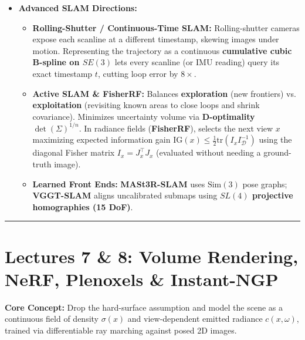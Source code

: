 \documentclass[10pt, a4paper]{article}
\newcommand{\hr}{\vspace{0.8em}\hrule\vspace{0.8em}}
\begin{document}
\begin{itemize}
\begin{itemize}
        \item \textbf{Thread 2 --- Local Mapping (per keyframe):} Updates the \textbf{Covisibility Graph} (edges between keyframes sharing $\ge 15$ points), triangulates new points, runs \textbf{Local BA} on the covisible neighborhood (keeping outer keyframes fixed), and culls redundant keyframes (where $\ge 90\%$ of points are seen by $\ge 3$ other keyframes).
        \item \textbf{Thread 3 --- Loop Closing \& Relocalization:} Queries a hierarchical \textbf{Bag of Binary Words (DBoW2)} vocabulary tree ($k$ branches, $L$ levels $\Rightarrow k^L$ words in only $kL$ comparisons) with an \textbf{inverted index}. Because monocular SLAM has \textbf{7-DoF drift} (rotation, translation, \emph{and scale}), loop correction optimizes the Essential Graph over \textbf{$\text{Sim}(3)$ similarity transforms} ($e_{ij} = \log(Z_{ij}^{-1} S_i S_j^{-1})^\vee \in \mathbb{R}^7$) rather than $SE(3)$.
    \end{itemize}
    \item \textbf{Advanced SLAM Directions:}
    \begin{itemize}
        \item \textbf{Rolling-Shutter / Continuous-Time SLAM:} Rolling-shutter cameras expose each scanline at a different timestamp, skewing images under motion. Representing the trajectory as a continuous \textbf{cumulative cubic B-spline on $SE(3)$} lets every scanline (or IMU reading) query its exact timestamp $t$, cutting loop error by $8\times$.
        \item \textbf{Active SLAM \& FisherRF:} Balances \textbf{exploration} (new frontiers) vs. \textbf{exploitation} (revisiting known areas to close loops and shrink covariance). Minimizes uncertainty volume via \textbf{D-optimality} $\det(\Sigma)^{1/n}$. In radiance fields (\textbf{FisherRF}), selects the next view $x$ maximizing expected information gain $\text{IG}(x) \le \frac{1}{2}\text{tr}(I_x I_{\mathcal{D}}^{-1})$ using the diagonal Fisher matrix $I_x = J_x^\top J_x$ (evaluated without needing a ground-truth image).
        \item \textbf{Learned Front Ends:} \textbf{MASt3R-SLAM} uses $\text{Sim}(3)$ pose graphs; \textbf{VGGT-SLAM} aligns uncalibrated submaps using \textbf{$SL(4)$ projective homographies (15 DoF)}.
    \end{itemize}
\end{itemize}

\hr
\section*{\textcolor{primary}{Lectures 7 \& 8: Volume Rendering, NeRF, Plenoxels \& Instant-NGP}}
\textbf{Core Concept:} Drop the hard-surface assumption and model the scene as a continuous field of density $\sigma(x)$ and view-dependent emitted radiance $c(x, \omega)$, trained via differentiable ray marching against posed 2D images.
\end{document}
